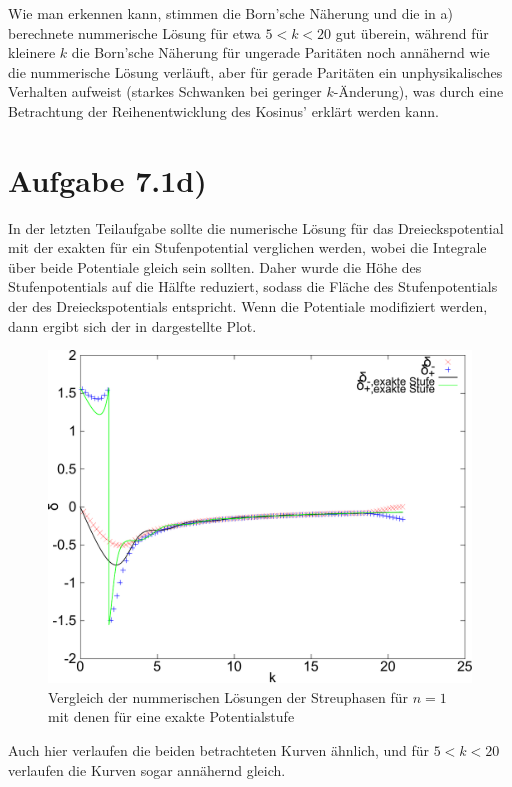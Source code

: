 Wie man erkennen kann, stimmen die Born'sche Näherung und die in a) berechnete
nummerische Lösung für etwa $5<k<20$ gut überein, während für kleinere $k$ die
Born'sche Näherung für ungerade Paritäten noch annähernd wie die nummerische Lösung
verläuft, aber für gerade Paritäten ein unphysikalisches Verhalten aufweist (starkes
Schwanken bei geringer $k$-Änderung), was durch eine Betrachtung der Reihenentwicklung
des Kosinus' erklärt werden kann.

\section*{Aufgabe 7.1d)}
In der letzten Teilaufgabe sollte die numerische Lösung für das Dreieckspotential
mit der exakten für ein Stufenpotential verglichen werden, wobei die Integrale über
beide Potentiale gleich sein sollten. Daher wurde die Höhe des Stufenpotentials auf
die Hälfte reduziert, sodass die Fläche des Stufenpotentials der des Dreieckspotentials
entspricht. Wenn die Potentiale modifiziert werden, dann ergibt sich der in 
dargestellte Plot.

\begin{figure}[htb]
  \centering
  \includegraphics[width=0.75\columnwidth,keepaspectratio]{../tmp/71d-crop}
  \caption{Vergleich der nummerischen Lösungen der Streuphasen für $n=1$ mit denen für eine
  exakte Potentialstufe}
  \label{fig:1d}
\end{figure}

Auch hier verlaufen die beiden betrachteten Kurven ähnlich, und für $5<k<20$ verlaufen
die Kurven sogar annähernd gleich.
